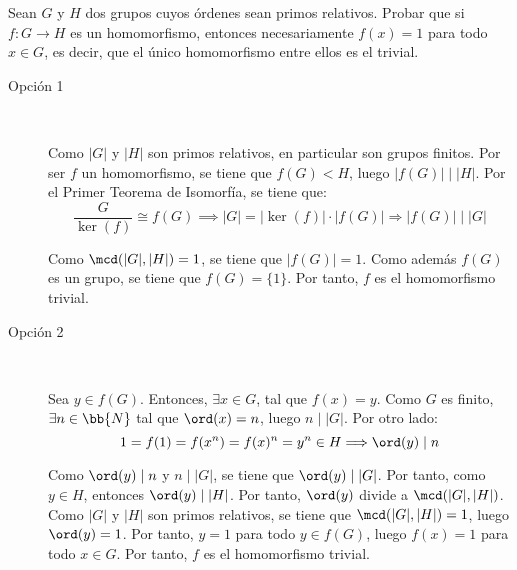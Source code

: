 \begin{ejercicio}
    Sean $G$ y $H$ dos grupos cuyos órdenes sean primos relativos. Probar que si $f:G\to H$ es un homomorfismo, entonces necesariamente $f(x)=1$ para todo $x\in G$, es decir, que el único homomorfismo entre ellos es el trivial.
    \begin{description}
        \item[Opción 1]~
        
        Como $|G|$ y $|H|$ son primos relativos, en particular son grupos finitos.    Por ser $f$ un homomorfismo, se tiene que $f(G)<H$, luego $|f(G)|\mid |H|$. Por el Primer Teorema de Isomorfía, se tiene que:
    \begin{equation*}
        \dfrac{G}{\ker(f)}\cong f(G) \implies |G| = |\ker(f)|\cdot |f(G)|\Longrightarrow |f(G)|\mid |G|
    \end{equation*}

    Como $\mcd(|G|,|H|)=1$, se tiene que $|f(G)|=1$. Como además $f(G)$ es un grupo, se tiene que $f(G)=\{1\}$. Por tanto, $f$ es el homomorfismo trivial.

        \item[Opción 2]~
        
        Sea $y\in f(G)$. Entonces, $\exists x\in G$, tal que $f(x)=y$. Como $G$ es finito, $\exists n\in \bb{N}$ tal que $\ord(x)=n$, luego $n\mid |G|$. Por otro lado:
        \begin{equation*}
            1=f(1)=f(x^n)=f(x)^n=y^n\in H\Longrightarrow \ord(y)\mid n
        \end{equation*}

        Como $\ord(y)\mid n$ y $n\mid |G|$, se tiene que $\ord(y)\mid |G|$. Por tanto, como $y\in H$, entonces $\ord(y)\mid |H|$. Por tanto, $\ord(y)$ divide a $\mcd(|G|,|H|)$. Como $|G|$ y $|H|$ son primos relativos, se tiene que $\mcd(|G|,|H|)=1$, luego $\ord(y)=1$. Por tanto, $y=1$ para todo $y\in f(G)$, luego $f(x)=1$ para todo $x\in G$. Por tanto, $f$ es el homomorfismo trivial.
    \end{description}
\end{ejercicio}

